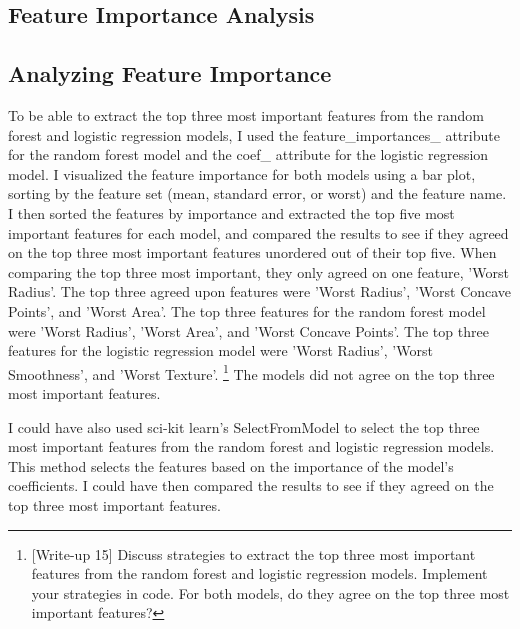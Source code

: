 \documentclass{labReport}
\begin{document}
\begin{multicols*}{2}
    \section{Feature Importance Analysis}
    \subsection{Analyzing Feature Importance}

    To be able to extract the top three most important features from the random forest and logistic regression models, I used the feature\_importances\_ attribute for the random forest model and the coef\_ attribute for the logistic regression model. I visualized the feature importance for both models using a bar plot, sorting by the feature set (mean, standard error, or worst) and the feature name. I then sorted the features by importance and extracted the top five most important features for each model, and compared the results to see if they agreed on the top three most important features unordered out of their top five. When comparing the top three most important, they only agreed on one feature, 'Worst Radius'. The top three agreed upon features were 'Worst Radius', 'Worst Concave Points', and 'Worst Area'. The top three features for the random forest model were 'Worst Radius', 'Worst Area', and 'Worst Concave Points'. The top three features for the logistic regression model were 'Worst Radius', 'Worst Smoothness', and 'Worst Texture'. \footnote{[Write-up 15] Discuss strategies to extract the top three most important features from the random forest and logistic regression models. Implement your strategies in code. For both models, do they agree on the top three most important features?} The models did not agree on the top three most important features.

    I could have also used sci-kit learn's SelectFromModel to select the top three most important features from the random forest and logistic regression models. This method selects the features based on the importance of the model's coefficients. I could have then compared the results to see if they agreed on the top three most important features.




\end{multicols*}
\end{document}
